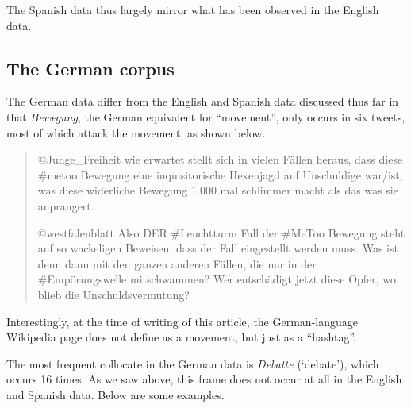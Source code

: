 \documentclass[output=paper,english,spanish,german,english]{langsci/langscibook}
\begin{document}
\noindent The Spanish data thus largely mirror what has been observed in the English data.

\subsection{The German corpus}

The German data differ from the English and Spanish data discussed thus far in that \textit{Bewegung}, the German equivalent for \enquote{movement}, only occurs in six tweets, most of which attack the movement, as shown below.

\begin{quote}\sffamily
  \foreignlanguage{german}{@Junge\_Freiheit wie erwartet stellt sich in vielen Fällen heraus, dass diese \#metoo Bewegung eine inquisitorische Hexenjagd auf Unschuldige war\slash ist, was diese widerliche Bewegung 1.000 mal schlimmer macht als das was sie anprangert.}

  \foreignlanguage{german}{@westfalenblatt Also DER \#Leuchtturm Fall der \#MeToo Bewegung steht auf so wa\-cke\-ligen Beweisen, dass der Fall eingestellt werden muss. Was ist denn dann mit den ganzen anderen Fällen, die nur in der \#Empörungswelle mitschwammen? Wer entschädigt jetzt diese Opfer, wo blieb die Unschuldsvermutung?}
\end{quote}

\noindent Interestingly, at the time of writing of this article, the German-language Wiki\-pe\-dia page does not define \mt as a movement, but just as a \enquote{hashtag}.

The most frequent collocate in the German data is \textit{Debatte} (`debate'), which occurs 16 times. As we saw above, this frame does not occur at all in the English and Spanish data. Below are some examples.
\end{document}
